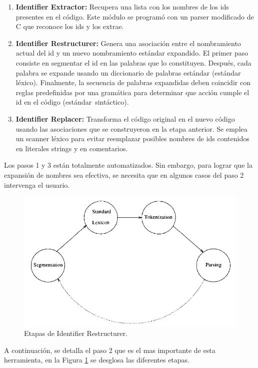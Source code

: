 \documentclass[a4paper,12pt]{report}
\begin{document}
\begin{enumerate}
\itemsep0em%
\item \textbf{Identifier Extractor:} Recupera una lista con los nombres de los ids presentes en el código. Este módulo se programó con un parser modificado de C que reconoce los ids y los extrae.
\item \textbf{Identifier Restructurer:} Genera una asociación entre el nombramiento actual del id y un nuevo nombramiento estándar expandido. El primer paso consiste en segmentar el id en las palabras que lo constituyen. Después, cada palabra se expande usando un diccionario de palabras estándar (estándar léxico). Finalmente, la secuencia de palabras expandidas deben coincidir con reglas predefinidas por una gramática para determinar que acción cumple el id en el código \mbox{(estándar sintáctico).}
\item \textbf{Identifier Replacer:} Transforma el código original en el nuevo código usando las asociaciones que se construyeron en la etapa anterior. Se emplea un scanner léxico para evitar reemplazar posibles nombres de ids contenidos en literales strings y en comentarios.
\end{enumerate}

Los pasos 1 y 3 están totalmente automatizados. Sin embargo, para lograr que la expansión de nombres sea efectiva, se necesita que en algunos casos del paso 2 intervenga el usuario.

\begin{figure}[h] %
\centering
\includegraphics[scale= 0.60]{./ire_2.png}
\caption{Etapas de Identifier Restructurer.}
\label{ire2}
\end{figure}

A continuación, se detalla el paso 2 que es el mas importante de esta herramienta, en la Figura \ref{ire2} se desglosa las diferentes etapas.
\end{document}
